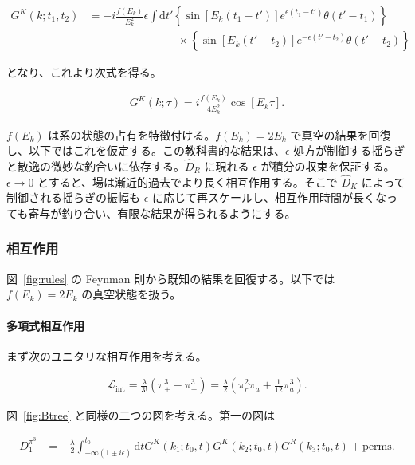 \documentclass[a4paper,11pt]{ltjsarticle}
\numberwithin{equation}{section}
\def\pia{\pi_{a}}
\def\pir{\pi_{r}}
\newcommand{\dd}{\mathrm{d}}
\newcommand{\ee}{e}
\newcommand{\Fig}[1]{Fig.~{\ref{#1}}}
\renewcommand{\Fig}[1]{図~\ref{#1}}
\begin{document}
\begin{align}
G^K (k;t_1,t_2) &= - i \frac{f(E_k)}{E_k^2} \epsilon \int \dd t'  \left\{\sin[E_k(t_1-t')] \ee^{\epsilon (t_1-t')} \theta(t'-t_1) \right\}\\
&\qquad \qquad \qquad \qquad \times \left\{\sin[E_k(t'-t_2)] \ee^{-\epsilon (t'-t_2)} \theta(t'-t_2) \right\} \nonumber 
\end{align}

となり、これより次式を得る。

\begin{align}\label{eq:distribM4}
G^K (k;\tau)  = i \frac{f(E_k)}{4E_k^2}\cos\left[E_k \tau\right].
\end{align}

$f(E_k)$ は系の状態の占有を特徴付ける。$f(E_k)=2E_k$ で真空の結果を回復し、以下ではこれを仮定する。この教科書的な結果は、$\epsilon$ 処方が制御する揺らぎと散逸の微妙な釣合いに依存する。$\widehat{D}_R$ に現れる $\epsilon$ が積分の収束を保証する。$\epsilon\rightarrow0$ とすると、場は漸近的過去でより長く相互作用する。そこで $\widehat{D}_K$ によって制御される揺らぎの振幅も $\epsilon$ に応じて再スケールし、相互作用時間が長くなっても寄与が釣り合い、有限な結果が得られるようにする。

\subsubsection*{相互作用}

\Fig{fig:rules} の Feynman 則から既知の結果を回復する。以下では $f(E_k)=2E_k$ の真空状態を扱う。

\paragraph{多項式相互作用} まず次のユニタリな相互作用を考える。

\begin{align}\label{eq:cubic}
\mathcal{L}_{\mathrm{int}} = \frac{\lambda}{3!}\left(\pi^3_+ - \pi^3_-\right) = \frac{\lambda}{2} \left(\pir^2 \pia + \frac{1}{12} \pia^3\right).
\end{align}

\Fig{fig:Btree} と同様の二つの図を考える。第一の図は

\begin{align}\label{eq:D1}
D^{\pi^3}_1 &= -\frac{\lambda}{2} \int_{-\infty(1\pm i \epsilon)}^{t_0} \dd t G^K(k_1; t_0,t) G^K(k_2; t_0,t)G^R(k_3; t_0,t) + \mathrm{perms}. 
\end{align}
\end{document}
